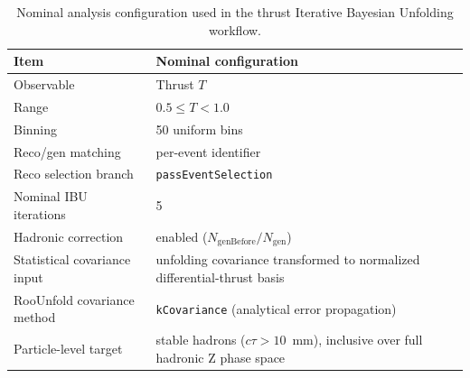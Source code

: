 \begin{table}[t!]
\centering
\begin{tabularx}{0.98\textwidth}{p{} X}
\hline
Item & Nominal configuration \\
\hline
Observable & Thrust $T$ \\
Range & $0.5 \le T < 1.0$ \\
Binning & 50 uniform bins \\
Reco/gen matching & per-event identifier \\
Reco selection branch & \texttt{passEventSelection} \\
Nominal IBU iterations & 5 \\
Hadronic correction & enabled ($N_{\mathrm{genBefore}}/N_{\mathrm{gen}}$) \\
Statistical covariance input & unfolding covariance transformed to normalized differential-thrust basis \\
RooUnfold covariance method & \texttt{kCovariance} (analytical error propagation) \\
Particle-level target & stable hadrons ($c\tau > 10$~mm), inclusive over full hadronic Z phase space \\
\hline
\end{tabularx}
\caption{Nominal analysis configuration used in the thrust Iterative Bayesian Unfolding workflow.}
\label{tab:method_config}
\end{table}
